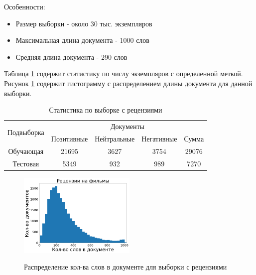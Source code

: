 Особенности:
\begin{itemize}
	\item Размер выборки - около 30 тыс. экземпляров
	\item Максимальная длина документа - 1000 слов
	\item Средняя длина документа - 290 слов
\end{itemize}

Таблица \ref{tab:kinopoisk} содержит статистику по числу экземпляров с определенной меткой. Рисунок \ref{fig:hist_kinopoisk} содержит гистограмму с распределением длины документа для данной выборки.

\begin{table}[H]
\centering
\caption{Статистика по выборке с рецензиями}
\label{tab:kinopoisk}
\begin{tabular}{|c|c|c|c|c|}
\hline
\multirow{2}{*}{Подвыборка} & \multicolumn{4}{c|}{Документы}                \\ \cline{2-5} 
                            & Позитивные & Нейтральные & Негативные & Сумма \\ \hline
Обучающая                   & 21695        & 3627        & 3754       & 29076 \\ \hline
Тестовая                    & 5349        & 932        & 989        & 7270  \\ \hline
\end{tabular}
\end{table}

\begin{figure}[H]
\centering
\caption{Распределение кол-ва слов в документе для выборки с рецензиями}
\includegraphics[width=0.5\textwidth]{images/hist_kinopoisk.png}
\label{fig:hist_kinopoisk}
\end{figure}